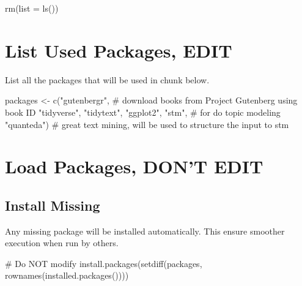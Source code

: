 \documentclass[
  letterpaper,
  DIV=11,
  numbers=noendperiod]{scrreprt}
\newenvironment{Shaded}{\begin{snugshade}}{\end{snugshade}}
\newcommand{\AttributeTok}[1]{\textcolor[rgb]{0.40,0.45,0.13}{#1}}
\newcommand{\CommentTok}[1]{\textcolor[rgb]{0.37,0.37,0.37}{#1}}
\newcommand{\FunctionTok}[1]{\textcolor[rgb]{0.28,0.35,0.67}{#1}}
\newcommand{\NormalTok}[1]{\textcolor[rgb]{0.00,0.23,0.31}{#1}}
\newcommand{\OtherTok}[1]{\textcolor[rgb]{0.00,0.23,0.31}{#1}}
\newcommand{\StringTok}[1]{\textcolor[rgb]{0.13,0.47,0.30}{#1}}
\begin{document}
\begin{Shaded}
\begin{Highlighting}[]
\FunctionTok{rm}\NormalTok{(}\AttributeTok{list =} \FunctionTok{ls}\NormalTok{())}
\end{Highlighting}
\end{Shaded}

\section*{List Used Packages, EDIT}\label{list-used-packages-edit-8}


List all the packages that will be used in chunk below.

\begin{Shaded}
\begin{Highlighting}[]
\NormalTok{packages }\OtherTok{\textless{}{-}} \FunctionTok{c}\NormalTok{(}\StringTok{"gutenbergr"}\NormalTok{, }\CommentTok{\# download books from Project Gutenberg using book ID}
              \StringTok{"tidyverse"}\NormalTok{,}
              \StringTok{"tidytext"}\NormalTok{,}
              \StringTok{"ggplot2"}\NormalTok{,}
              \StringTok{"stm"}\NormalTok{, }\CommentTok{\# for do topic modeling}
              \StringTok{"quanteda"}\NormalTok{) }\CommentTok{\# great text mining, will be used to structure the input to stm}
\end{Highlighting}
\end{Shaded}

\section*{Load Packages, DON'T EDIT}\label{sec-packages}


\subsection*{Install Missing}\label{install-missing-8}

Any missing package will be installed automatically. This ensure
smoother execution when run by others.

\begin{Shaded}
\begin{Highlighting}[]
\CommentTok{\# Do NOT modify}
\FunctionTok{install.packages}\NormalTok{(}\FunctionTok{setdiff}\NormalTok{(packages, }\FunctionTok{rownames}\NormalTok{(}\FunctionTok{installed.packages}\NormalTok{())))}
\end{Highlighting}
\end{Shaded}
\end{document}
